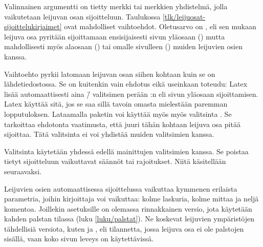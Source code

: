 
\noindent
Valinnainen argumentti  on tietty merkki tai merkkien
yhdistelmä, jolla vaikutetaan leijuvan osan sijoitteluun. Taulukossa
\ref{tlk/leijuosat-sijoittelukirjaimet} ovat mahdolliset vaihtoehdot.
Oletusarvo on , eli sen mukaan leijuva osa pyritään
sijoittamaan ensisijaisesti sivun yläosaan () mutta
mahdollisesti myös alaosaan () tai omalle sivulleen ()
muiden leijuvien osien kanssa.

Vaihtoehto  pyrkii latomaan leijuvan osan siihen kohtaan kuin
se on lähdetiedostossa. Se on kuitenkin vain ehdotus eikä useinkaan
toteudu: Latex lisää automaattisesti aina \=/ valitsimen perään
:n eli sivun yläosaan sijoittamisen. Latex käyttää sitä, jos se
saa sillä tavoin omasta mielestään paremman lopputuloksen. Lataamalla
paketin  voi käyttää myös myös valitsinta
. Se tarkoittaa ehdotonta vaatimusta, että juuri tähän kohtaan
leijuva osa pitää sijoittaa. Tätä valitsinta ei voi yhdistää muiden
valitsimien kanssa.

Valitsinta \koodi{!} käytetään yhdessä edellä mainittujen valitsimien
 kanssa. Se poistaa tietyt sijoitteluun vaikuttavat säännöt
tai rajoitukset. Niitä käsitellään seuraavaksi.

Leijuvien osien automaattisessa sijoittelussa vaikuttaa kymmenen
erilaista parametria, joihin kirjoittaja voi vaikuttaa: kolme laskuria,
kolme mittaa ja neljä komentoa. Joillekin asetuksille on olemassa
rinnakkainen versio, jota käytetään kahden palstan tilassa (luku
\ref{luku/palstat}). Ne koskevat leijuvien ympäristöjen tähdellisiä
versiota, kuten  ja , eli
tilannetta, jossa leijuva osa ei ole palstojen sisällä, vaan koko sivun
leveys on käytettävissä.

